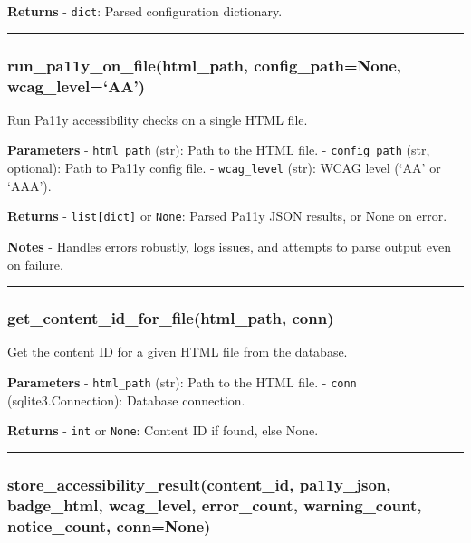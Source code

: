 \textbf{Returns} - \texttt{dict}: Parsed configuration dictionary.

\begin{center}\rule{0.5\linewidth}{0.5pt}\end{center}

\subsubsection{run\_pa11y\_on\_file(html\_path, config\_path=None,
wcag\_level=`AA')}\label{run_pa11y_on_filehtml_path-config_pathnone-wcag_levelaa}

Run Pa11y accessibility checks on a single HTML file.

\textbf{Parameters} - \texttt{html\_path} (str): Path to the HTML file.
- \texttt{config\_path} (str, optional): Path to Pa11y config file. -
\texttt{wcag\_level} (str): WCAG level (`AA' or `AAA').

\textbf{Returns} - \texttt{list{[}dict{]}} or \texttt{None}: Parsed
Pa11y JSON results, or None on error.

\textbf{Notes} - Handles errors robustly, logs issues, and attempts to
parse output even on failure.

\begin{center}\rule{0.5\linewidth}{0.5pt}\end{center}

\subsubsection{get\_content\_id\_for\_file(html\_path,
conn)}\label{get_content_id_for_filehtml_path-conn}

Get the content ID for a given HTML file from the database.

\textbf{Parameters} - \texttt{html\_path} (str): Path to the HTML file.
- \texttt{conn} (sqlite3.Connection): Database connection.

\textbf{Returns} - \texttt{int} or \texttt{None}: Content ID if found,
else None.

\begin{center}\rule{0.5\linewidth}{0.5pt}\end{center}

\subsubsection{store\_accessibility\_result(content\_id, pa11y\_json,
badge\_html, wcag\_level, error\_count, warning\_count, notice\_count,
conn=None)}\label{store_accessibility_resultcontent_id-pa11y_json-badge_html-wcag_level-error_count-warning_count-notice_count-connnone}

